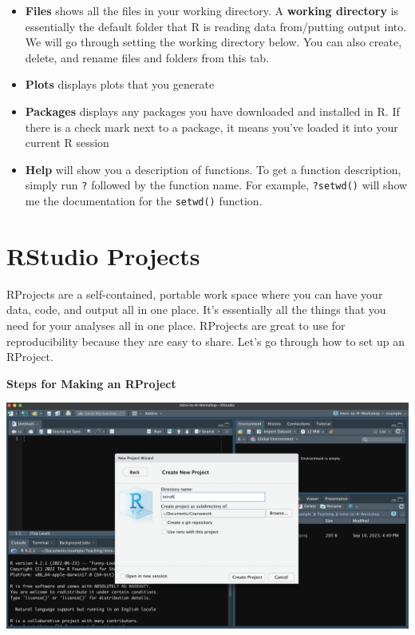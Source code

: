 \documentclass[
]{book}
\providecommand{\tightlist}{%
  \setlength{\itemsep}{0pt}\setlength{\parskip}{0pt}}
\begin{document}
\begin{itemize}
\tightlist
\item
  \textbf{Files} shows all the files in your working directory. A \textbf{working directory} is essentially the default folder that R is reading data from/putting output into. We will go through setting the working directory below. You can also create, delete, and rename files and folders from this tab.
\item
  \textbf{Plots} displays plots that you generate
\item
  \textbf{Packages} displays any packages you have downloaded and installed in R. If there is a check mark next to a package, it means you've loaded it into your current R session
\item
  \textbf{Help} will show you a description of functions. To get a function description, simply run \texttt{?} followed by the function name. For example, \texttt{?setwd()} will show me the documentation for the \texttt{setwd()} function.
\end{itemize}

\section{RStudio Projects}\label{rstudio-projects}

RProjects are a self-contained, portable work space where you can have your data, code, and output all in one place. It's essentially all the things that you need for your analyses all in one place. RProjects are great to use for reproducibility because they are easy to share. Let's go through how to set up an RProject.

\textbf{Steps for Making an RProject}

\includegraphics{./docs/files/RProject.png}
\end{document}
